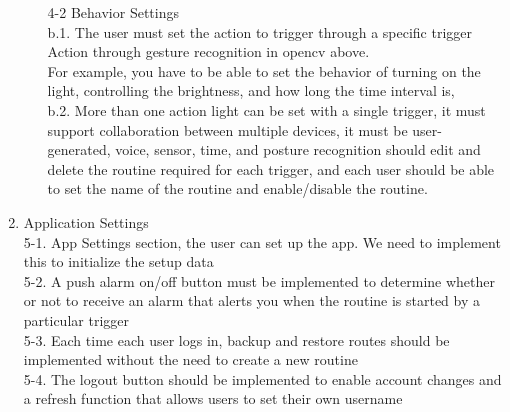 \documentclass[11pt, conference]{IEEEtran}
\begin{document}
\begin{enumerate}[label=\arabic*]
\begin{enumerate}[label=\alph*]
        \item [4-2]{\large{Behavior Settings}}\\

        
        b.1. The user must set the action to trigger through a specific trigger Action through gesture recognition in opencv above. \\
        
        For example, you have to be able to set the behavior of turning on the light, controlling the brightness, and how long the time interval is,\\

        b.2. More than one action light can be set with a single trigger, it must support collaboration between multiple devices, it must be user-generated,
        voice, sensor, time, and posture recognition should edit and delete the routine required for each trigger, and each user should be able to set the name of the routine and enable/disable the routine.\\
    \end{enumerate}

    \item {\large{Application Settings}}\\


    5-1. App Settings section, the user can set up the app. We need to implement this to initialize the setup data\\


    5-2. A push alarm on/off button must be implemented to determine whether or not to receive an alarm that alerts you when the routine is started by a particular trigger\\


    5-3. Each time each user logs in, backup and restore routes should be implemented without the need to create a new routine\\


    5-4. The logout button should be implemented to enable account changes and a refresh function that allows users to set their own username
    
\end{enumerate}
\end{document}
